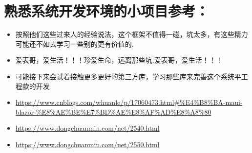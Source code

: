 \documentclass[9pt, b5paper]{article}
\begin{document}
\section{熟悉系统开发环境的小项目参考：}
\label{sec-11}
\begin{itemize}
\item 按照他们这些过来人的经验说法，这个框架不值得一碰，坑太多，有这些精力可能还不如去学习一些别的更有价值的.
\item 爱表哥，爱生活！！！珍爱生命，远离那些坑.爱表哥，爱生活！！！
\item 可能接下来会试着接触更多更好的第三方库，学习那些库来完善这个系统平工程款的开发
\item \url{https://www.cnblogs.com/whuanle/p/17060473.html#\%E4\%B8\%BA-maui-blazor-\%E8\%AE\%BE\%E7\%BD\%AE\%E8\%AF\%AD\%E8\%A8\%80}
\item \url{https://www.dongchuanmin.com/net/2540.html}
\item \url{https://www.dongchuanmin.com/net/2550.html}
\end{itemize}
\end{document}
